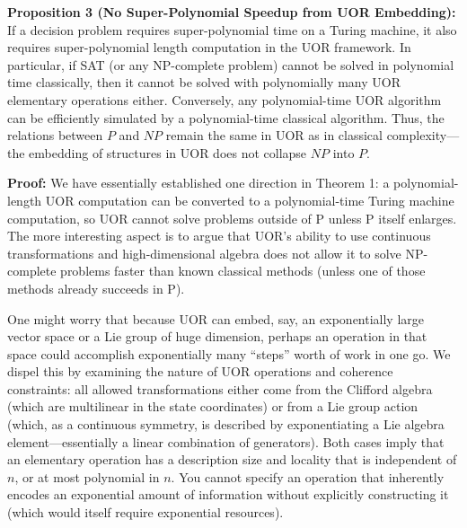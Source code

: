 \documentclass{article}
\begin{document}
\medskip
\textbf{Proposition 3 (No Super-Polynomial Speedup from UOR Embedding):} If a decision problem requires super-polynomial time on a Turing machine, it also requires super-polynomial length computation in the UOR framework. In particular, if SAT (or any NP-complete problem) cannot be solved in polynomial time classically, then it cannot be solved with polynomially many UOR elementary operations either. Conversely, any polynomial-time UOR algorithm can be efficiently simulated by a polynomial-time classical algorithm. Thus, the relations between $P$ and $NP$ remain the same in UOR as in classical complexity—the embedding of structures in UOR does not collapse $NP$ into $P$.

\medskip
\textbf{Proof:} We have essentially established one direction in Theorem 1: a polynomial-length UOR computation can be converted to a polynomial-time Turing machine computation, so UOR cannot solve problems outside of P unless P itself enlarges. The more interesting aspect is to argue that UOR’s ability to use continuous transformations and high-dimensional algebra does not allow it to solve NP-complete problems faster than known classical methods (unless one of those methods already succeeds in P).

One might worry that because UOR can embed, say, an exponentially large vector space or a Lie group of huge dimension, perhaps an operation in that space could accomplish exponentially many “steps” worth of work in one go. We dispel this by examining the nature of UOR operations and coherence constraints: all allowed transformations either come from the Clifford algebra (which are multilinear in the state coordinates) or from a Lie group action (which, as a continuous symmetry, is described by exponentiating a Lie algebra element—essentially a linear combination of generators). Both cases imply that an elementary operation has a description size and locality that is independent of $n$, or at most polynomial in $n$. You cannot specify an operation that inherently encodes an exponential amount of information without explicitly constructing it (which would itself require exponential resources).
\end{document}
